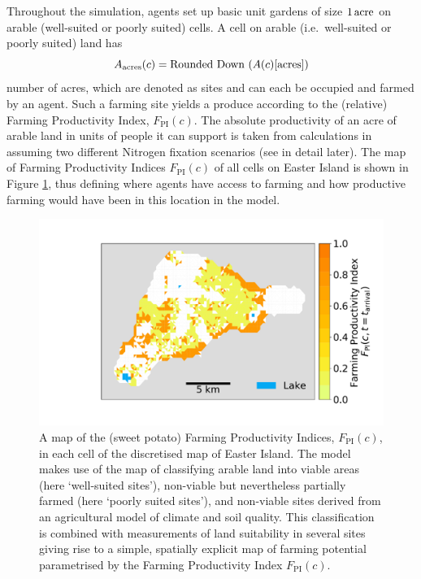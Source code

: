 Throughout the simulation, agents set up basic unit gardens of size $1\, {\rm acre}$ on arable (well-suited or poorly suited) cells.%
A cell on arable (i.e.\ well-suited or poorly suited) land has
\begin{equation}
A_{\rm acres}(c) = \text{Rounded Down }(A(c)[\text{acres}])
\end{equation}
number of acres, which are denoted as sites and can each be occupied and farmed by an agent.
Such a farming site yields a produce according to the (relative) Farming Productivity Index, $F_\text{PI}(c)$.
The absolute productivity of an acre of arable land in units of people it can support is taken from calculations in \citet{Puleston2017} assuming two different Nitrogen fixation scenarios (see in detail later).
The map of Farming Productivity Indices $F_\text{PI}(c)$ of all cells on Easter Island is shown in Figure \ref{fig:Map_agric}, thus defining where agents have access to farming and how productive farming would have been in this location in the model. 

\begin{figure}
	\centering
	\includegraphics[width=\textwidth]{images/Plot_F_PI_c.pdf}
	\caption{A map of the (sweet potato) Farming Productivity Indices, $F_\text{PI}(c)$, in each cell of the discretised map of Easter Island. The model makes use of the map of \citet{Puleston2017} classifying arable land into viable areas (here `well-suited sites'), non-viable but nevertheless partially farmed (here `poorly suited sites'), and non-viable sites derived from an agricultural model of climate and soil quality. 
	This classification is combined with measurements of land suitability in several sites \citep{Louwagie2006} giving rise to a simple, spatially explicit map of farming potential parametrised by the Farming Productivity Index $F_\text{PI}(c)$.}
	\label{fig:Map_agric}
\end{figure}


